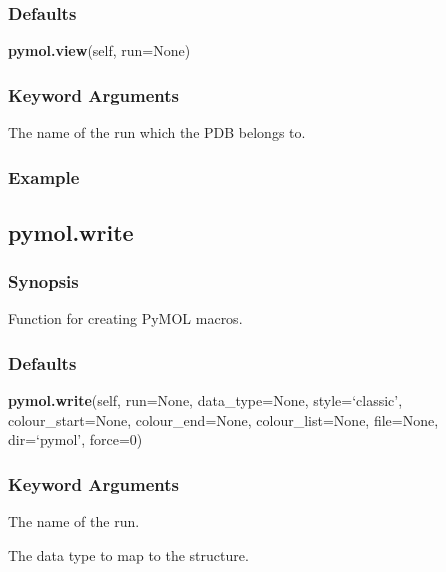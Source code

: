   
 \subsubsection{Defaults} 

 \textsf{\textbf{pymol.view}(self, run=None)} 

  
 \subsubsection{Keyword Arguments} 

   The name of the run which the PDB belongs to.  

  

  
 \subsubsection{Example} 



  

 \newpage 

 \subsection{pymol.write} 

  
 \subsubsection{Synopsis} 

 Function for creating PyMOL macros. 
  

  
 \subsubsection{Defaults} 

 \textsf{\textbf{pymol.write}(self, run=None, data\_type=None, style=`classic', colour\_start=None, colour\_end=None, colour\_list=None, file=None, dir=`pymol', force=0)} 

  
 \subsubsection{Keyword Arguments} 

   The name of the run.   

   The data type to map to the structure.   

